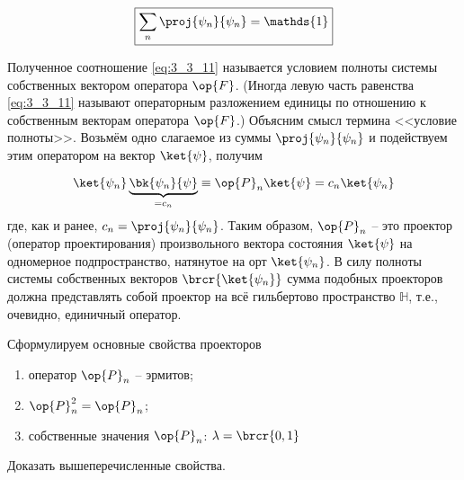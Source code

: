 \begin{equation}
\label{eq:3_3_11}
\boxed {
	\sum_n \proj{\psi_n}{\psi_n} = \mathds{1}
}
\end{equation}

Полученное соотношение \eqref{eq:3_3_11} называется условием полноты системы собственных вектором оператора $\op{F}$. (Иногда левую часть равенства \eqref{eq:3_3_11} называют операторным разложением единицы по отношению к собственным векторам оператора $\op{F}$.) Объясним смысл термина <<условие полноты>>. Возьмём одно слагаемое из суммы $\proj{\psi_n}{\psi_n}$ и подействуем этим оператором на вектор $\ket{\psi}$, получим

\begin{equation}
\label{eq:3_3_12}
\ket{\psi_n} \underbrace{\bk{\psi_n}{\psi}}_{ = c_n} \equiv
  \op{P}_n \ket{\psi} = c_n \ket{\psi_n}
\end{equation}%
%
где, как и ранее, $c_n = \proj{\psi_n}{\psi_n}$. Таким образом, $\op{P}_n$ -- это проектор (оператор проектирования) произвольного вектора состояния $\ket{\psi}$ на одномерное подпространство, натянутое на орт $\ket{\psi_n}$. В силу полноты системы собственных векторов $\brcr{\ket{\psi_n}}$ сумма подобных проекторов должна представлять собой проектор на всё гильбертово пространство $\mathbb{H}$, т.е., очевидно, единичный оператор.

Сформулируем основные свойства проекторов

\begin{enumerate}
\item оператор $\op{P}_n$ -- эрмитов;
\item $\op{P}_n^2 = \op{P}_n$; ~~\footnotemark
\item собственные значения $\op{P}_n$: $\lambda = \brcr{0, 1}$
\end{enumerate}

\begin{excr}
Доказать вышеперечисленные свойства.
\end{excr}


